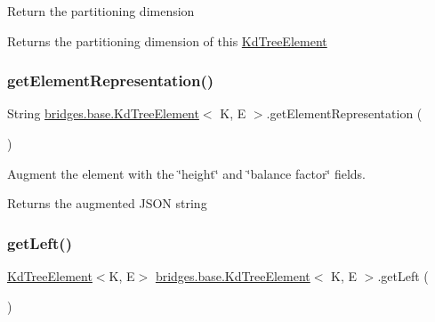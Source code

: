 Return the partitioning dimension

\begin{DoxyReturn}{Returns}
the partitioning dimension of this \mbox{\hyperlink{classbridges_1_1base_1_1_kd_tree_element}{Kd\+Tree\+Element}} 
\end{DoxyReturn}
\mbox{\label{classbridges_1_1base_1_1_kd_tree_element_adf9bed8c71a7c257a1359c3c88b808f0}} 
\subsubsection{\texorpdfstring{getElementRepresentation()}{getElementRepresentation()}}
{\footnotesize\ttfamily String \mbox{\hyperlink{classbridges_1_1base_1_1_kd_tree_element}{bridges.\+base.\+Kd\+Tree\+Element}}$<$ K, E $>$.get\+Element\+Representation (\begin{DoxyParamCaption}{ }\end{DoxyParamCaption})}

Augment the element with the \char`\"{}height\char`\"{} and \char`\"{}balance factor\char`\"{} fields.

\begin{DoxyReturn}{Returns}
the augmented J\+S\+ON string 
\end{DoxyReturn}
\mbox{\label{classbridges_1_1base_1_1_kd_tree_element_a257367edc8f204c973eb277dcb5d37be}} 
\subsubsection{\texorpdfstring{getLeft()}{getLeft()}}
{\footnotesize\ttfamily \mbox{\hyperlink{classbridges_1_1base_1_1_kd_tree_element}{Kd\+Tree\+Element}}$<$K, E$>$ \mbox{\hyperlink{classbridges_1_1base_1_1_kd_tree_element}{bridges.\+base.\+Kd\+Tree\+Element}}$<$ K, E $>$.get\+Left (\begin{DoxyParamCaption}{ }\end{DoxyParamCaption})}

